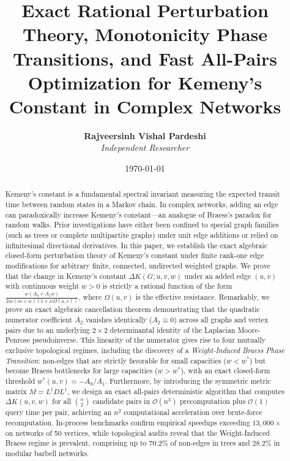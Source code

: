 \documentclass[11pt,a4paper]{article}
\title{\textbf{Exact Rational Perturbation Theory, Monotonicity Phase Transitions, and Fast All-Pairs Optimization for Kemeny's Constant in Complex Networks}}
\author{
    \textbf{Rajveersinh Vishal Pardeshi}\\[0.5em]
    \textit{Independent Researcher}
}
\date{\today}
\theoremstyle{plain}
\theoremstyle{definition}
\begin{document}
\maketitle

\begin{abstract}
Kemeny's constant is a fundamental spectral invariant measuring the expected transit time between random states in a Markov chain. In complex networks, adding an edge can paradoxically increase Kemeny's constant---an analogue of Braess's paradox for random walks. Prior investigations have either been confined to special graph families (such as trees or complete multipartite graphs) under unit edge additions or relied on infinitesimal directional derivatives. In this paper, we establish the exact algebraic closed-form perturbation theory of Kemeny's constant under finite rank-one edge modifications for arbitrary finite, connected, undirected weighted graphs. We prove that the change in Kemeny's constant $\Delta K(G; u, v, w)$ under an added edge $(u, v)$ with continuous weight $w > 0$ is strictly a rational function of the form $\frac{w(A_0 + A_1 w)}{2m(m+w)(1+w\Omega(u, v))}$, where $\Omega(u, v)$ is the effective resistance. Remarkably, we prove an exact algebraic cancellation theorem demonstrating that the quadratic numerator coefficient $A_2$ vanishes identically ($A_2 \equiv 0$) across all graphs and vertex pairs due to an underlying $2 \times 2$ determinantal identity of the Laplacian Moore-Penrose pseudoinverse. This linearity of the numerator gives rise to four mutually exclusive topological regimes, including the discovery of a \textit{Weight-Induced Braess Phase Transition}: non-edges that are strictly favorable for small capacities ($w < w^*$) but become Braess bottlenecks for large capacities ($w > w^*$), with an exact closed-form threshold $w^*(u, v) = -A_0 / A_1$. Furthermore, by introducing the symmetric metric matrix $M = L^\dagger D L^\dagger$, we design an exact all-pairs deterministic algorithm that computes $\Delta K(u, v, w)$ for all $\binom{n}{2}$ candidate pairs in $\mathcal{O}(n^3)$ precomputation plus $\mathcal{O}(1)$ query time per pair, achieving an $n^2$ computational acceleration over brute-force recomputation. In-process benchmarks confirm empirical speedups exceeding $13,000\times$ on networks of 50 vertices, while topological audits reveal that the Weight-Induced Braess regime is prevalent, comprising up to $70.2\%$ of non-edges in trees and $28.2\%$ in modular barbell networks.
\end{abstract}
\end{document}
